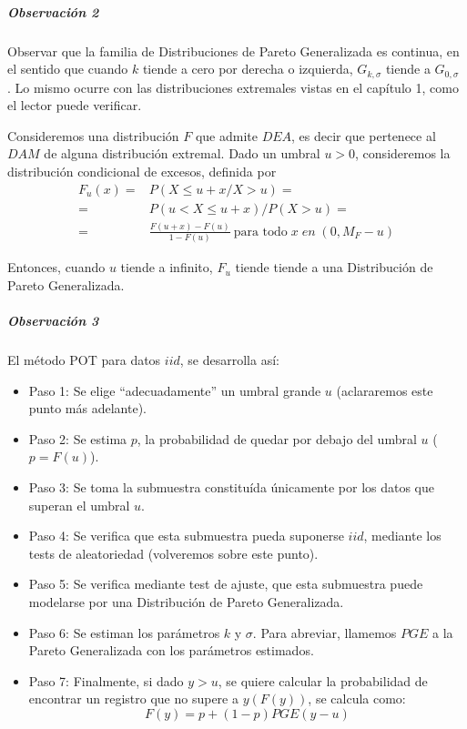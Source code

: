 \documentclass[
  12pt]{article}
\begin{document}
\subparagraph{Observación 2}\label{observaciuxf3n-2}

Observar que la familia de Distribuciones de Pareto Generalizada es
continua, en el sentido que cuando \(k\) tiende a cero por derecha o
izquierda, \(G_{k,\sigma}\) tiende a \(G_{0,\sigma}\) . Lo mismo ocurre
con las distribuciones extremales vistas en el capítulo 1, como el
lector puede verificar.

\begin{theorem}
Consideremos una distribución $F$ que admite $DEA$, es decir que pertenece al $DAM$ de alguna distribución extremal. Dado un umbral $u>0$, consideremos la distribución condicional de excesos, definida por
\begin{align}
F_u(x)= &P(X \leq  u+x/ X>u)= \nonumber \\
=&P(u<X \leq u+x)/P(X>u)= \nonumber \\
=&\frac{F(u+x)-F(u)}{1-F(u)}\:\text{para todo}\; x\; en\;(0,M_{F}-u)
\end{align}
\end{theorem}

Entonces, cuando \(u\) tiende a infinito, \(F_u\) tiende tiende a una
Distribución de Pareto Generalizada.

\subparagraph{Observación 3}\label{observaciuxf3n-3}

El método POT para datos \(iid\), se desarrolla así:

\begin{itemize}
\item Paso 1: Se elige “adecuadamente” un umbral grande $u$ (aclararemos este punto más adelante).
\item Paso 2: Se estima $p$, la probabilidad de quedar por debajo del umbral $u$ ($p=F(u)$).
\item Paso 3: Se toma la submuestra constituída únicamente por los datos que superan el umbral $u$.
\item Paso 4: Se verifica que esta submuestra pueda suponerse $iid$, mediante los tests de aleatoriedad (volveremos sobre este punto).
\item Paso 5: Se verifica mediante test de ajuste, que esta submuestra puede modelarse por una Distribución de Pareto Generalizada.
\item Paso 6: Se estiman los parámetros $k$ y $\sigma$. Para abreviar, llamemos $PGE$ a la Pareto Generalizada con los parámetros estimados.
\item Paso 7: Finalmente, si dado $y >u$, se quiere calcular la probabilidad de encontrar un registro que no supere a $y (F(y))$, se calcula como:
\begin{equation}
F(y)=p +(1-p)PGE(y-u)
\end{equation}
\end{itemize}
\end{document}

